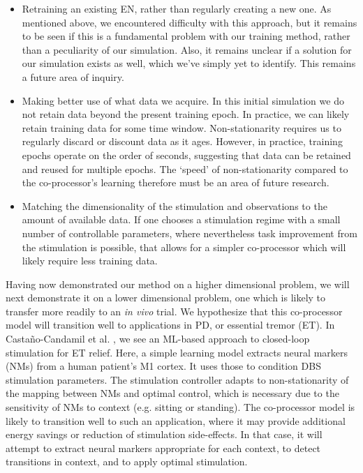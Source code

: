 \documentclass[12pt]{iopart}
\begin{document}
\begin{itemize}
	\item Retraining an existing EN, rather than regularly creating a new one. As
	      mentioned above, we encountered difficulty with this approach, but it remains
	      to be seen if this is a fundamental problem with our training method, rather
	      than a peculiarity of our simulation. Also, it remains unclear if a solution
	      for our simulation exists as well, which we've simply yet to identify. This
	      remains a future area of inquiry.
	\item Making better use of what data we acquire. In this initial simulation we do
	      not retain data beyond the present training epoch. In practice, we can likely
	      retain training data for some time window. Non-stationarity requires us to
	      regularly discard or discount data as it ages. However, in practice, training
	      epochs operate on the order of seconds, suggesting that data can be retained
	      and reused for multiple epochs. The `speed' of non-stationarity compared to
	      the co-processor's learning therefore must be an area of future research.
	\item Matching the dimensionality of the stimulation and observations
	      to the amount of available data. If one chooses a stimulation regime with
	      a small number of controllable parameters, where nevertheless task improvement
	      from the stimulation is possible, that allows for a simpler co-processor which
	      will likely require less training data.
\end{itemize}

Having now demonstrated our method on a higher dimensional problem, we will next demonstrate
it on a lower dimensional problem, one which is likely to transfer more readily to
an \textit{in vivo} trial. We hypothesize that this co-processor model will transition well
to applications in PD, or essential tremor (ET). In Castaño-Candamil et al. \cite{castano.pd},
we see an ML-based approach to closed-loop stimulation for ET relief. Here, a simple learning
model extracts neural markers (NMs) from a human patient's M1 cortex. It uses those to
condition DBS stimulation parameters. The stimulation controller adapts to non-stationarity
of the mapping between NMs and optimal control, which is necessary due to the sensitivity
of NMs to context (e.g. sitting or standing). The co-processor model is likely to
transition well to such an application, where it may provide additional energy savings
or reduction of stimulation side-effects. In that case, it will attempt to extract neural
markers appropriate for each context, to detect transitions in context, and to apply
optimal stimulation.
\end{document}
